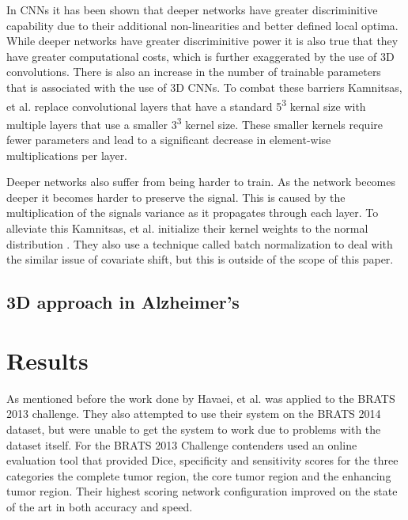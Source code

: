 \documentclass{sig-alternate}
\begin{document}

In CNNs it has been shown that deeper networks have greater discriminitive capability due to their additional non-linearities and better defined local optima. While deeper networks have greater discriminitive power it is also true that they have greater computational costs, which is further exaggerated by the use of 3D convolutions. There is also an increase in the number of trainable parameters that is associated with the use of 3D CNNs. To combat these barriers Kamnitsas, et al. replace convolutional layers that have a standard 5\textsuperscript{3} kernal size with multiple layers that use a smaller 3\textsuperscript{3} kernel size. These smaller kernels require fewer parameters and lead to a significant decrease in element-wise multiplications per layer. ~\cite{Kamnitsas:2017}

Deeper networks also suffer from being harder to train. As the network becomes deeper it becomes harder to preserve the signal. This is caused by the multiplication of the signals variance as it propagates through each layer. To alleviate this Kamnitsas, et al. initialize their kernel weights to the normal distribution . They also use a technique called batch normalization to deal with the similar issue of covariate shift, but this is outside of the scope of this paper.



\subsection{3D approach in Alzheimer's}
\label{sec:3DAlzheimers}



\section{Results}
\label{sec:results}

As mentioned before the work done by Havaei, et al. was applied to the BRATS 2013 challenge. They also attempted to use their system on the BRATS 2014 dataset, but were unable to get the system to work due to problems with the dataset itself. For the BRATS 2013 Challenge contenders used an online evaluation tool that provided Dice, specificity and sensitivity scores for the three categories the complete tumor region, the core tumor region and the enhancing tumor region. Their highest scoring network configuration improved on the state of the art in both accuracy and speed.
\end{document}
